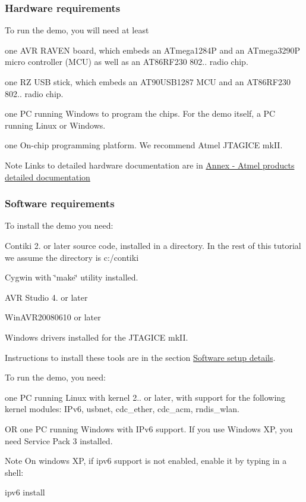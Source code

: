  \hypertarget{a00072_hardware}{}\subsubsection{Hardware requirements}\label{a00072_hardware}
To run the demo, you will need at least \begin{DoxyItemize}
\item one A\+VR R\+A\+V\+EN board, which embeds an A\+Tmega1284P and an A\+Tmega3290P micro controller (M\+CU) as well as an A\+T86\+R\+F230 802.. radio chip. \item one RZ U\+SB stick, which embeds an A\+T90\+U\+S\+B1287 M\+CU and an A\+T86\+R\+F230 802.. radio chip. \item one PC running Windows to program the chips. For the demo itself, a PC running Linux or Windows. \item one On-\/chip programming platform. We recommend Atmel J\+T\+A\+G\+I\+CE mk\+II.\end{DoxyItemize}
\begin{DoxyNote}{Note}
Links to detailed hardware documentation are in \hyperlink{a00072_annex_hardware}{Annex -\/ Atmel products detailed documentation}
\end{DoxyNote}


 \hypertarget{a00072_software}{}\subsubsection{Software requirements}\label{a00072_software}
To install the demo you need\+: \begin{DoxyItemize}
\item Contiki 2. or later source code, installed in a directory. In the rest of this tutorial we assume the directory is c\+:/contiki \item Cygwin with \char`\"{}make\char`\"{} utility installed. \item A\+VR Studio 4. or later \item Win\+A\+V\+R20080610 or later \item Windows drivers installed for the J\+T\+A\+G\+I\+CE mk\+II.\end{DoxyItemize}
Instructions to install these tools are in the section \hyperlink{a00072_annex_software}{Software setup details}.~\newline


To run the demo, you need\+: \begin{DoxyItemize}
\item one PC running Linux with kernel 2.. or later, with support for the following kernel modules\+: I\+Pv6, usbnet, cdc\+\_\+ether, cdc\+\_\+acm, rndis\+\_\+wlan. \item OR one PC running Windows with I\+Pv6 support. If you use Windows XP, you need Service Pack 3 installed.\end{DoxyItemize}
\begin{DoxyNote}{Note}
On windows XP, if ipv6 support is not enabled, enable it by typing in a shell\+: \begin{DoxyVerb}ipv6 install
\end{DoxyVerb}

\end{DoxyNote}


